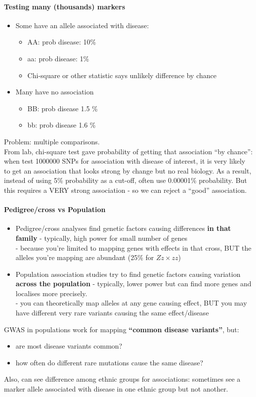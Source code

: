 \documentclass{scrartcl}
\begin{document}
\paragraph{Testing many (thousands) markers}
\begin{itemize}
\item Some have an allele associated with disease:
  \begin{itemize}
  \item AA: prob disease: 10\%
  \item aa: prob disease: 1\%
  \item Chi-square or other statistic says unlikely difference by chance 
  \end{itemize}
\item Many have no association
  \begin{itemize}
  \item BB: prob disease 1.5 \%
  \item bb: prob disease 1.6 \%
  \end{itemize}
\end{itemize}
Problem: multiple comparisons. \\
From lab, chi-square test gave probability of getting that association ``by chance'': when test 1000000 SNPs for association with disease of interest, it is very likely to get an association that looks strong by change but no real biology.
As a result, instead of using 5\% probability as a cut-off, often use 0.00001\% probability.
But this requires a VERY strong association - so we can reject a ``good'' association.

\paragraph{Pedigree/cross vs Population}
\begin{itemize}
\item Pedigree/cross analyses find genetic factors causing differences {\bf in that family} - typically, high power for small number of genes\\
- because you're limited to mapping genes with effects in that cross, BUT the alleles you're mapping are abundant (25\% for $Zz \times zz$)
\item Population association studies try to find genetic factors causing variation {\bf across the population} - typically, lower power but can find more genes and localises more precisely.\\
- you can theoretically map alleles at any gene causing effect, BUT you may have different very rare variants causing the same effect/disease
\end{itemize}
GWAS in populations work for mapping {\bf ``common disease variants''}, but:
\begin{itemize}
\item are most disease variants common?
\item how often do different rare mutations cause the same disease?
\end{itemize}
Also, can see difference among ethnic groups for associations: sometimes see a marker allele associated with disease in one ethnic group but not another.
\end{document}

